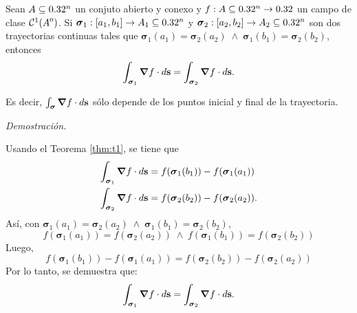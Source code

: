 \begin{corollary}\label{tmh:c1}
    Sean $A\subseteq0.32^n$ un conjuto abierto y conexo y  $f:A\subseteq0.32^n\to0.32$ un campo de clase $\mathcal{C}^1({\kern0ptA}^{\mathrm{o}})$.  Si  $\boldsymbol{\sigma}_1:[a_1,b_1]\to A_1\subseteq0.32^n$ y $\boldsymbol{\sigma}_2:[a_2,b_2]\to A_2\subseteq0.32^n$ son dos trayectorias continuas  tales que $\boldsymbol{\sigma}_1(a_1)=\boldsymbol{\sigma}_2(a_2)\;\land\;\boldsymbol{\sigma}_1(b_1)=\boldsymbol{\sigma}_2(b_2)$, entonces
    \[
    \int_{\boldsymbol{\sigma}_1}\grad f\cdot d\mathbf{s}=\int_{\boldsymbol{\sigma}_2}\grad f\cdot d\mathbf{s}.
    \]
    
 Es decir,  $\int_{\boldsymbol{\sigma}}\grad f\cdot d\mathbf{s}$  s\'olo depende de los puntos inicial y final de la trayectoria.

\textit{Demostración.} 

Usando el Teorema \ref{thm:t1}, se tiene que
\begin{align*}
    \int_{\boldsymbol{\sigma}_1}\grad f\cdot d\mathbf{s}&=f(\boldsymbol{\sigma}_1(b_1))-f(\boldsymbol{\sigma}_1(a_1))\\
    \int_{\boldsymbol{\sigma}_2}\grad f\cdot d\mathbf{s}&=f(\boldsymbol{\sigma}_2(b_2))-f(\boldsymbol{\sigma}_2(a_2)).
\end{align*}
Así, con $\boldsymbol{\sigma}_1(a_1)=\boldsymbol{\sigma}_2(a_2)\;\land\;\boldsymbol{\sigma}_1(b_1)=\boldsymbol{\sigma}_2(b_2)$,
\begin{equation*}
    f(\boldsymbol{\sigma}_1(a_1))=f(\boldsymbol{\sigma}_2(a_2))\;\land\;f(\boldsymbol{\sigma}_1(b_1))=f(\boldsymbol{\sigma}_2(b_2))
\end{equation*}
Luego,
\begin{equation*}
    f(\boldsymbol{\sigma}_1(b_1))-f(\boldsymbol{\sigma}_1(a_1))=f(\boldsymbol{\sigma}_2(b_2))-f(\boldsymbol{\sigma}_2(a_2))
\end{equation*}
Por lo tanto, se demuestra que:
\begin{equation*}
    \int_{\boldsymbol{\sigma}_1}\grad f\cdot d\mathbf{s}=\int_{\boldsymbol{\sigma}_2}\grad f\cdot d\mathbf{s}.
\end{equation*}
\end{corollary}


